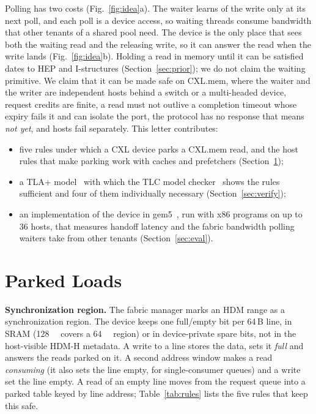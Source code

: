 \documentclass[journal]{IEEEtran}
\begin{document}
Polling has two costs (Fig.~\ref{fig:idea}a). The waiter learns of the write only at its next poll,
and each poll is a device access, so waiting threads consume bandwidth that other tenants of a
shared pool need. The device is the only place that sees both the waiting read and the releasing
write, so it can answer the read when the write lands (Fig.~\ref{fig:idea}b). Holding a read in
memory until it can be satisfied dates to HEP and I-structures (Section~\ref{sec:prior}); we do not claim the waiting
primitive. We claim that it can be made safe on CXL.mem, where the waiter and the writer are
independent hosts behind a switch or a multi-headed device, request credits are finite, a read must
not outlive a completion timeout whose expiry fails it and can isolate the port, the protocol has
no response that means \emph{not yet}, and hosts fail separately. This letter contributes:
\begin{itemize}
\item five rules under which a CXL device parks a CXL.mem read, and the host rules that make
parking work with caches and prefetchers (Section~\ref{sec:design});
\item a TLA+ model~\cite{tla} with which the TLC model checker~\cite{tlc} shows the rules sufficient
and four of them individually necessary (Section~\ref{sec:verify});
\item an implementation of the device in gem5~\cite{gem5}, run with x86 programs on up to 36 hosts,
that measures handoff latency and the fabric bandwidth polling waiters take from other tenants
(Section~\ref{sec:eval}).
\end{itemize}

\section{Parked Loads}
\label{sec:design}
\textbf{Synchronization region.} The fabric manager marks an HDM range as a synchronization region.
The device keeps one full/empty bit per 64\,B line, in SRAM (\SI{128}{\kibi\byte}
covers a \SI{64}{\mebi\byte} region) or in device-private spare bits, not in the host-visible HDM-H metadata.
A write to a line stores the data, sets it \emph{full} and answers the reads parked on it. A second
address window makes a read \emph{consuming} (it also sets the line empty, for single-consumer
queues) and a write set the line empty. A read of an empty line moves from the request queue into a
parked table keyed by line address; Table~\ref{tab:rules} lists the five rules that keep this safe.
\end{document}
